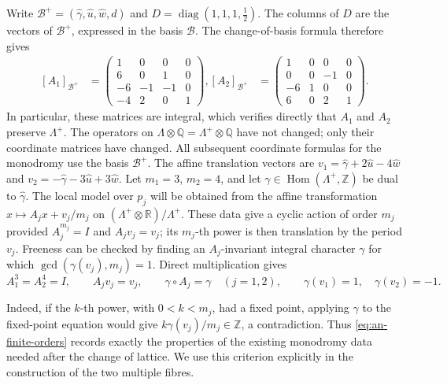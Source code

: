\documentclass[11pt]{article}
\theoremstyle{definition}
\theoremstyle{remark}
\numberwithin{equation}{section}
\newcommand{\ZZ}{\mathbb Z}
\begin{document}
Write $\mathcal B^+=(\widehat\gamma,\widehat u,\widehat w,d)$ and
$D=\operatorname{diag}(1,1,1,\tfrac12)$.
The columns of $D$ are the vectors of $\mathcal B^+$, expressed in
the basis $\mathcal B$.  The change-of-basis formula therefore gives
\begin{equation}\label{eq:an-monodromy-matrices}
 \begin{aligned}
 [A_1]_{\mathcal B^+}
 &
 =\begin{pmatrix}
  1&0&0&0\\
  6&0&1&0\\
  -6&-1&-1&0\\
  -4&2&0&1
 \end{pmatrix},
 [A_2]_{\mathcal B^+}
 &
 =\begin{pmatrix}
  1&0&0&0\\
  0&0&-1&0\\
  -6&1&0&0\\
  6&0&2&1
 \end{pmatrix}.
 \end{aligned}
\end{equation}
In particular, these matrices are integral, which verifies directly that
$A_1$ and $A_2$ preserve $\Lambda^+$.  The operators on
$\Lambda\otimes\mathbb Q=\Lambda^+\otimes\mathbb Q$ have not changed;
only their coordinate matrices have changed.  All subsequent coordinate
formulas for the monodromy use the basis $\mathcal B^+$.
The affine translation vectors are
$v_1=\widehat\gamma+2\widehat u-4\widehat w$ and
$v_2=-\widehat\gamma-3\widehat u+3\widehat w$.
Let $m_1=3$, $m_2=4$, and let
$\gamma\in\operatorname{Hom}(\Lambda^+,\ZZ)$ be dual to
$\widehat\gamma$.  The local model over $p_j$ will be obtained from the
affine transformation $x\longmapsto A_jx+v_j/m_j$ on
$(\Lambda^+\otimes\mathbb R)/\Lambda^+$.
These data give a cyclic action of order $m_j$ provided
$A_j^{m_j}=I$ and $A_jv_j=v_j$; its $m_j$-th power is then translation
by the period $v_j$.  Freeness can be checked by finding an
$A_j$-invariant integral character $\gamma$ for which
$\gcd(\gamma(v_j),m_j)=1$.  Direct multiplication gives
\begin{equation}\label{eq:an-finite-orders}
 A_1^3=A_2^4=I,
 \qquad A_jv_j=v_j,
 \qquad \gamma\circ A_j=\gamma\quad (j=1,2),
 \qquad \gamma(v_1)=1,\quad\gamma(v_2)=-1.
\end{equation}%

Indeed, if the $k$-th power, with $0<k<m_j$, had a fixed point, applying
$\gamma$ to the fixed-point equation would give
$k\gamma(v_j)/m_j\in\mathbb Z$, a contradiction.  Thus
\eqref{eq:an-finite-orders} records exactly the properties of the existing
monodromy data needed after the change of lattice.  We use this criterion
explicitly in the construction of the two multiple fibres.
\end{document}
